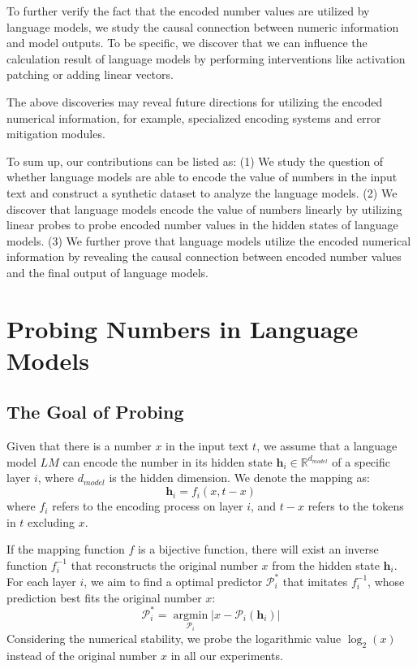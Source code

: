 \documentclass[11pt]{article}
\begin{document}
To further verify the fact that the encoded number values are utilized by language models, we study the causal connection between numeric information and model outputs.
To be specific, we discover that we can influence the calculation result of language models by performing interventions like activation patching or adding linear vectors.

The above discoveries may reveal future directions for utilizing the encoded numerical information, for example, specialized encoding systems and error mitigation modules.

To sum up, our contributions can be listed as:
(1) We study the question of whether language models are able to encode the value of numbers in the input text and construct a synthetic dataset to analyze the language models.
(2) We discover that language models encode the value of numbers linearly by utilizing linear probes to probe encoded number values in the hidden states of language models.
(3) We further prove that language models utilize the encoded numerical information by revealing the causal connection between encoded number values and the final output of language models.



\section{Probing Numbers in Language Models}
\subsection{The Goal of Probing}
Given that there is a number $x$ in the input text $t$, we assume that a language model $LM$ can encode the number in its hidden state $\mathbf{h}_i \in \mathbb{R}^{d_{model}}$ of a specific layer $i$, where $d_{model}$ is the hidden dimension. 
We denote the mapping as:
\begin{equation}
    \mathbf{h}_i = f_{i}(x, t-x)
\end{equation}
where $f_{i}$ refers to the encoding process on layer $i$, and $t-x$ refers to the tokens in $t$ excluding $x$.

If the mapping function $f$ is a bijective function, there will exist an inverse function $f^{-1}_{i}$ that reconstructs the original number $x$ from the hidden state $\mathbf{h}_i$.
For each layer $i$, we aim to find a optimal predictor $\mathcal{P}_{i}^{*}$ that imitates $f^{-1}_{i}$, whose prediction best fits the original number $x$:
\begin{equation}
    \mathcal{P}_{i}^{*} = \mathop{\arg\min}\limits_{\mathcal{P}_{i}} |x-\mathcal{P}_{i}(\mathbf{h}_i)| 
\end{equation}
Considering the numerical stability, we probe the logarithmic value $\log_{2}(x)$ instead of the original number $x$ in all our experiments.
\end{document}
